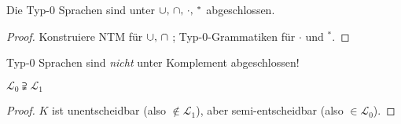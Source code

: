 \begin{Satz}[name={[Abgeschlossenheit von Typ-0 Sprachen]}]\label{satz:Typ-0-abgeschl}
	Die Typ-0 Sprachen sind unter $\thinmuskip=6mu\cup,\cap,\cdot,{}^*$ abgeschlossen.
\end{Satz}
\begin{proof}
	Konstruiere \ac{NTM} für $\thinmuskip=6mu\cup,\cap$ ; Typ-0-Grammatiken für $\cdot$ und $^*$.
\end{proof}

\begin{Bem}
	Typ-0 Sprachen sind \emph{nicht} unter Komplement abgeschlossen!
\end{Bem}


\begin{Korollar}
	$\mathcal{L}_0 \supsetneqq \mathcal{L}_1$
\end{Korollar}
\begin{proof}
	$K$ ist unentscheidbar (also $\notin \mathcal{L}_1$), aber semi-entscheidbar (also $\in \mathcal{L}_0$).
\end{proof}
